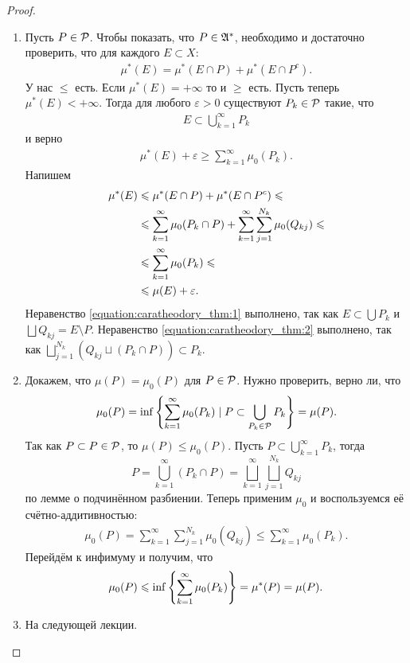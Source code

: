 \begin{proof}\
 \begin{enumerate}
  \item Пусть $ P \in \mathcal{P} $. Чтобы показать, что $ P \in \mathfrak{A}^\ast $, необходимо и достаточно проверить, что для каждого $ E \subset X $:
   \begin{align*}
    \mu^\ast(E) = \mu^\ast(E \cap P) + \mu^\ast(E \cap P^c)
   .\end{align*} У нас $ \leqslant $ есть. Если $ \mu^\ast(E) = +\infty $ то и $ \geqslant $ есть. Пусть теперь $ \mu^\ast(E) < +\infty $. Тогда для любого $ \varepsilon > 0 $ существуют $ P_k \in \mathcal{P} $ такие, что
   \begin{align*}
    E \subset \bigcup_{k=1}^\infty P_k
   \end{align*} и верно
   \begin{align*}
     \mu^\ast(E) + \varepsilon \geqslant \sum_{k=1}^{\infty} \mu_0(P_k)
   .\end{align*} Напишем
   \begin{align}
    \nonumber
    \mu^\ast(E) &\leqslant \mu^\ast(E \cap P) + \mu^\ast(E \cap P^c) \leqslant \\
    \label{equation:caratheodory_thm:1}
    &\leqslant \sum_{k=1}^\infty \mu_0(P_k \cap P) + \sum_{k=1}^\infty \sum_{j=1}^{N_k} \mu_0(Q_{kj}) \leqslant \\
    \label{equation:caratheodory_thm:2}
    & \leqslant \sum_{k=1}^\infty \mu_0(P_k) \leqslant \\
    \nonumber
    &\leqslant \mu(E) + \varepsilon 
   .\end{align} Неравенство \eqref{equation:caratheodory_thm:1} выполнено, так как $E \subset \bigcup P_k$ и $\bigsqcup Q_{kj} = E \setminus P$. Неравенство \eqref{equation:caratheodory_thm:2} выполнено, так как $\bigsqcup_{j=1}^{N_k} \left(Q_{kj} \sqcup (P_k \cap P)\right) \subset P_k$.

  \item Докажем, что $ \mu(P) = \mu_0(P) $ для $ P \in \mathcal{P} $. Нужно проверить, верно ли, что
   \begin{align*}
    \mu_0(P) = \inf \left\{ \sum_{k=1}^{\infty} \mu_0(P_k) \mid P \subset \bigcup_{P_k \in \mathcal{P}} P_k \right\} = \mu(P)
   .\end{align*} Так как $ P \subset P \in \mathcal{P} $, то $ \mu(P) \leqslant \mu_0(P) $. Пусть $ P \subset \displaystyle\bigcup_{k=1}^\infty P_k $, тогда $$  
   P = \bigcup_{k=1}^\infty (P_k \cap P) = \bigsqcup_{k=1}^\infty \bigsqcup_{j=1}^{N_k} Q_{kj}
   $$ по лемме о подчинённом разбиении. Теперь применим $ \mu_0 $ и воспользуемся её счётно-аддитивностью:
   \begin{align*}
    \mu_0(P) = \sum_{k=1}^{\infty} \sum_{j=1}^{N_k} \mu_0(Q_{kj}) \leqslant \sum_{k=1}^{\infty} \mu_0(P_k)
   .\end{align*} Перейдём к инфимуму и получим, что 
   \begin{align*}
    \mu_0(P) \leqslant \inf \left\{ \sum_{k=1}^{\infty} \mu_0(P_k) \right\}  = \mu^\ast(P) = \mu(P)
   .\end{align*}

  \item На следующей лекции.
 \end{enumerate}
\end{proof}

